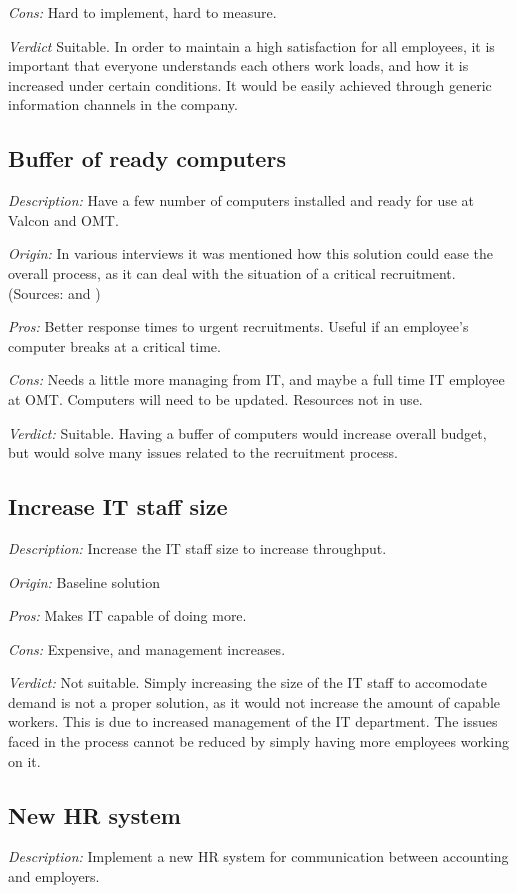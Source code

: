 \noindent \emph{Cons:} Hard to implement, hard to measure.

\emph{Verdict}
Suitable. In order to maintain a high satisfaction for all employees, it is important that everyone understands each others work loads, and how it is increased under certain conditions. It would be easily achieved through generic information channels in the company.

\subsection{Buffer of ready computers}
\emph{Description:} Have a few number of computers installed and ready for use at Valcon and OMT.

\emph{Origin:}
In various interviews it was mentioned how this solution could ease the overall process, as it can deal with the situation of a critical recruitment.
(Sources:  and )

\noindent \emph{Pros:} Better response times to urgent recruitments. Useful if an employee's computer breaks at a critical time.

\noindent \emph{Cons:} Needs a little more managing from IT, and maybe a full time IT employee at OMT. Computers will need to be updated. Resources not in use.

\emph{Verdict:}
Suitable. Having a buffer of computers would increase overall budget, but would solve many issues related to the recruitment process.

\subsection{Increase IT staff size}
\emph{Description:} Increase the IT staff size to increase throughput.

\emph{Origin:}
Baseline solution

\noindent \emph{Pros:} Makes IT capable of doing more.

\noindent \emph{Cons:} Expensive, and management increases.

\emph{Verdict:}
Not suitable. Simply increasing the size of the IT staff to accomodate demand is not a proper solution, as it would not increase the amount of capable workers. This is due to increased management of the IT department. The issues faced in the process cannot be reduced by simply having more employees working on it.

\subsection{New HR system}
\emph{Description:} Implement a new HR system for communication between accounting and employers.

